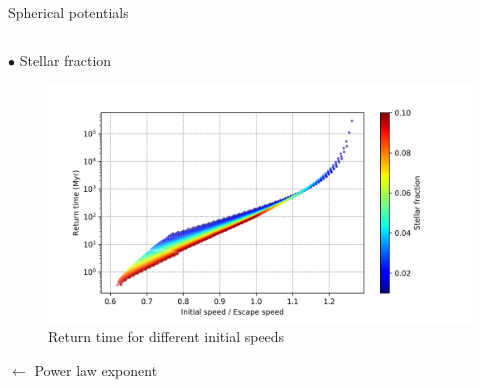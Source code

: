 \documentclass{beamer}
\begin{document}
\begin{frame}{Spherical potentials}
\begin{columns}
\begin{column}{0.7\textwidth}
			\hspace{1cm} $\bullet$ Stellar fraction
			\begin{figure}[h]
				\centering
				\includegraphics[width=0.9\linewidth]{"../Files/Week 10/returntimes_speed"}
				\caption{Return time for different initial speeds}
			\end{figure}
		
			$\longleftarrow$ Power law exponent
		\end{column}
	\end{columns}	
\end{frame}
\end{document}

